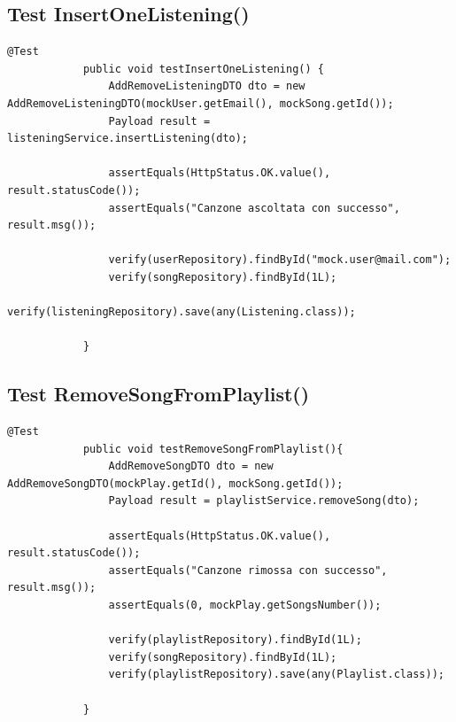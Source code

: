 \documentclass{article}
\begin{document}
		\subsection{Test InsertOneListening()}
		\begin{lstlisting}[style=JavaStyle, label={lst:java_code}]
			@Test
			public void testInsertOneListening() {
				AddRemoveListeningDTO dto = new AddRemoveListeningDTO(mockUser.getEmail(), mockSong.getId());
				Payload result = listeningService.insertListening(dto);
				
				assertEquals(HttpStatus.OK.value(), result.statusCode());
				assertEquals("Canzone ascoltata con successo", result.msg());
				
				verify(userRepository).findById("mock.user@mail.com");
				verify(songRepository).findById(1L);
				verify(listeningRepository).save(any(Listening.class));
				
			}
		\end{lstlisting}
		\newpage
		\subsection{Test RemoveSongFromPlaylist()}
		\begin{lstlisting}[style=JavaStyle, label={lst:java_code}]
			@Test
			public void testRemoveSongFromPlaylist(){
				AddRemoveSongDTO dto = new AddRemoveSongDTO(mockPlay.getId(), mockSong.getId());
				Payload result = playlistService.removeSong(dto);
				
				assertEquals(HttpStatus.OK.value(), result.statusCode());
				assertEquals("Canzone rimossa con successo", result.msg());
				assertEquals(0, mockPlay.getSongsNumber());
				
				verify(playlistRepository).findById(1L);
				verify(songRepository).findById(1L);
				verify(playlistRepository).save(any(Playlist.class));
				
			}
		\end{lstlisting}
		\newpage
\end{document}
